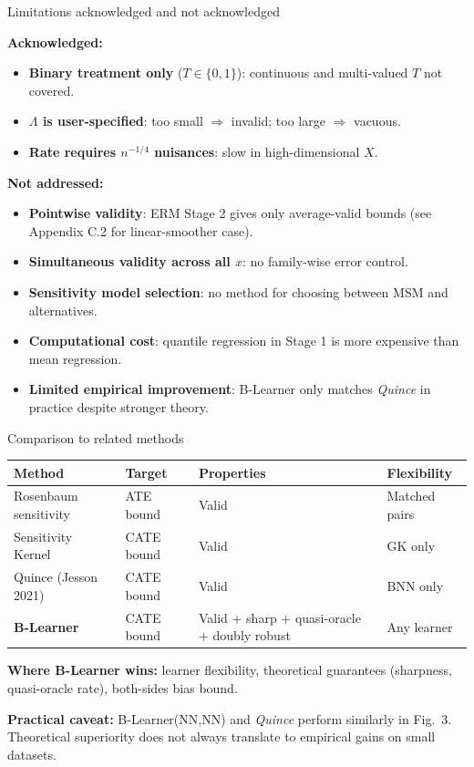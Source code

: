 \documentclass[aspectratio=169]{beamer}
\begin{document}
\begin{frame}{Limitations acknowledged and not acknowledged}

\textbf{Acknowledged:}
\begin{itemize}\small
  \item \textbf{Binary treatment only} ($T\in\{0,1\}$): continuous and multi-valued $T$ not covered.
  \item \textbf{$\Lambda$ is user-specified}: too small $\Rightarrow$ invalid; too large $\Rightarrow$ vacuous.
  \item \textbf{Rate requires $n^{-1/4}$ nuisances}: slow in high-dimensional $X$.
\end{itemize}

\smallskip
\textbf{Not addressed:}
\begin{itemize}\small
  \item \textbf{Pointwise validity}: ERM Stage 2 gives only average-valid bounds (see Appendix C.2 for linear-smoother case).
  \item \textbf{Simultaneous validity across all $x$}: no family-wise error control.
  \item \textbf{Sensitivity model selection}: no method for choosing between MSM and alternatives.
  \item \textbf{Computational cost}: quantile regression in Stage 1 is more expensive than mean regression.
  \item \textbf{Limited empirical improvement}: B-Learner only matches \textit{Quince} in practice despite stronger theory.
\end{itemize}
\end{frame}


\begin{frame}{Comparison to related methods}

\small
\begin{tabular}{p{2.8cm}p{2.8cm}p{3.0cm}p{2.2cm}}
\toprule
\textbf{Method} & \textbf{Target} & \textbf{Properties} & \textbf{Flexibility} \\
\midrule
Rosenbaum sensitivity & ATE bound & Valid & Matched pairs \\
Sensitivity Kernel & CATE bound & Valid & GK only \\
Quince (Jesson 2021) & CATE bound & Valid & BNN only \\
\midrule
\textbf{B-Learner} & CATE bound & Valid + sharp + quasi-oracle + doubly robust & Any learner \\
\bottomrule
\end{tabular}
\normalsize

\smallskip
\textbf{Where B-Learner wins:} learner flexibility, theoretical guarantees (sharpness, quasi-oracle rate), both-sides bias bound.

\smallskip
\textbf{Practical caveat:} B-Learner(NN,NN) and \textit{Quince} perform similarly in Fig.~3. Theoretical superiority does not always translate to empirical gains on small datasets.
\end{frame}
\end{document}
